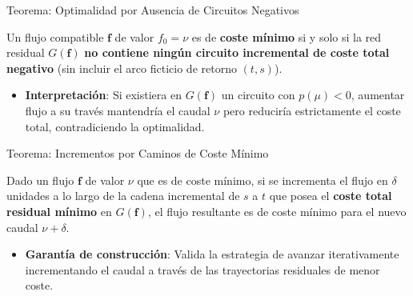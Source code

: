 \documentclass[
  ignorenonframetext,
]{beamer}
\providecommand{\tightlist}{%
  \setlength{\itemsep}{0pt}\setlength{\parskip}{0pt}}
\begin{document}
\begin{frame}{Teorema: Optimalidad por Ausencia de Circuitos Negativos}
\label{teorema-optimalidad-por-ausencia-de-circuitos-negativos}
\begin{tcolorbox}[enhanced jigsaw, opacityback=0, breakable, title=\textcolor{quarto-callout-important-color}{\faExclamation}\hspace{0.5em}{Optimalidad por ausencia de circuitos incrementales de coste negativo}, colback=white, colbacktitle=quarto-callout-important-color!10!white, bottomrule=.15mm, opacitybacktitle=0.6, coltitle=black, bottomtitle=1mm, leftrule=.75mm, colframe=quarto-callout-important-color-frame, toptitle=1mm, titlerule=0mm, rightrule=.15mm, left=2mm, arc=.35mm, toprule=.15mm]

Un flujo compatible \(\mathbf{f}\) de valor \(f_0 = \nu\) es de
\textbf{coste mínimo} si y solo si la red residual \(G(\mathbf{f})\)
\textbf{no contiene ningún circuito incremental de coste total negativo}
(sin incluir el arco ficticio de retorno \((t, s)\)).

\end{tcolorbox}

\begin{itemize}
\tightlist
\item
  \textbf{Interpretación}: Si existiera en \(G(\mathbf{f})\) un circuito
  con \(p(\mu) < 0\), aumentar flujo a su través mantendría el caudal
  \(\nu\) pero reduciría estrictamente el coste total, contradiciendo la
  optimalidad.
\end{itemize}
\end{frame}

\begin{frame}{Teorema: Incrementos por Caminos de Coste Mínimo}
\label{teorema-incrementos-por-caminos-de-coste-muxednimo}
\begin{tcolorbox}[enhanced jigsaw, opacityback=0, breakable, title=\textcolor{quarto-callout-important-color}{\faExclamation}\hspace{0.5em}{Incrementos por caminos de coste mínimo}, colback=white, colbacktitle=quarto-callout-important-color!10!white, bottomrule=.15mm, opacitybacktitle=0.6, coltitle=black, bottomtitle=1mm, leftrule=.75mm, colframe=quarto-callout-important-color-frame, toptitle=1mm, titlerule=0mm, rightrule=.15mm, left=2mm, arc=.35mm, toprule=.15mm]

Dado un flujo \(\mathbf{f}\) de valor \(\nu\) que es de coste mínimo, si
se incrementa el flujo en \(\delta\) unidades a lo largo de la cadena
incremental de \(s\) a \(t\) que posea el \textbf{coste total residual
mínimo} en \(G(\mathbf{f})\), el flujo resultante es de coste mínimo
para el nuevo caudal \(\nu + \delta\).

\end{tcolorbox}

\begin{itemize}
\tightlist
\item
  \textbf{Garantía de construcción}: Valida la estrategia de avanzar
  iterativamente incrementando el caudal a través de las trayectorias
  residuales de menor coste.
\end{itemize}
\end{frame}
\end{document}
